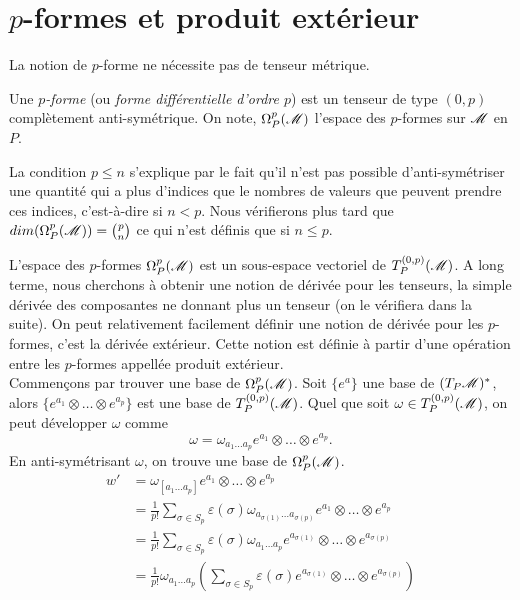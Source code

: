 \documentclass[a4paper,11pt]{report}
\begin{document}
        \section{$p$-formes et produit extérieur}
        
            La notion de $p$-forme ne nécessite pas de tenseur métrique.
            
            \begin{defn}
                Une $p$\textit{-forme} (ou \textit{forme différentielle d'ordre $p$}) est un tenseur de type $(0,p)$ complètement anti-symétrique. On note, $\Omega_P^p(\mathscr{M})$ l'espace des $p$-formes sur $\mathscr{M}$ en $P$.
            \end{defn}
            
            \begin{rmk}
                La condition $p\leq n$ s'explique par le fait qu'il n'est pas possible d'anti-symétriser une quantité qui a plus d'indices que le nombres de valeurs que peuvent prendre ces indices, c'est-à-dire si $n<p$. Nous vérifierons plus tard que $dim(\Omega_P^p(\mathscr{M})) = {p \choose n}$ ce qui n'est définis que si $n\leq p$.
            \end{rmk}
            
             L'espace des $p$-formes $\Omega_P^p(\mathscr{M})$ est un sous-espace vectoriel de $T_P^{(0,p)}(\mathscr{M})$. A long terme, nous cherchons à obtenir une notion de dérivée pour les tenseurs, la simple dérivée des composantes ne donnant plus un tenseur (on le vérifiera dans la suite). On peut relativement facilement définir une notion de dérivée pour les $p$-formes, c'est la dérivée extérieur. Cette notion est définie à partir d'une opération entre les $p$-formes appellée produit extérieur.\\
            
            Commençons par trouver une base de $\Omega_P^p(\mathscr{M})$. Soit $\{e^a\}$ une base de $(T_P\mathscr{M})^*$, alors $\{e^{a_1}\otimes\dots \otimes e^{a_p}\}$ est une base de $T_P^{(0,p)}(\mathscr{M})$. Quel que soit $\omega\in T_P^{(0,p)}(\mathscr{M})$, on peut développer $\omega$ comme
            \begin{equation}
                \omega = \omega_{a_1\dots a_p} e^{a_1}\otimes\dots\otimes e^{a_p}.
            \end{equation}
            En anti-symétrisant $\omega$, on trouve une base de $\Omega_P^p(\mathscr{M})$.
            \begin{align}\label{dev:pformebase}
                w' &= \omega_{[a_1\dots a_p]} e^{a_1}\otimes\dots\otimes e^{a_p}\\
                &= \frac{1}{p!} \sum_{\sigma\in S_p}\varepsilon(\sigma) \omega_{a_{\sigma(1)}\dots a_{\sigma(p)}} e^{a_1}\otimes\dots\otimes e^{a_p}\\
                &= \frac{1}{p!} \sum_{\sigma\in S_p}\varepsilon(\sigma) \omega_{a_1\dots a_p} e^{a_{\sigma(1)}}\otimes\dots\otimes e^{a_{\sigma(p)}}\\
                &= \frac{1}{p!}\omega_{a_1\dots a_p} \left( \sum_{\sigma\in S_p}\varepsilon(\sigma)  e^{a_{\sigma(1)}}\otimes\dots\otimes e^{a_{\sigma(p)}}\right)\label{eq:pformebase}
            \end{align}
            
\end{document}
